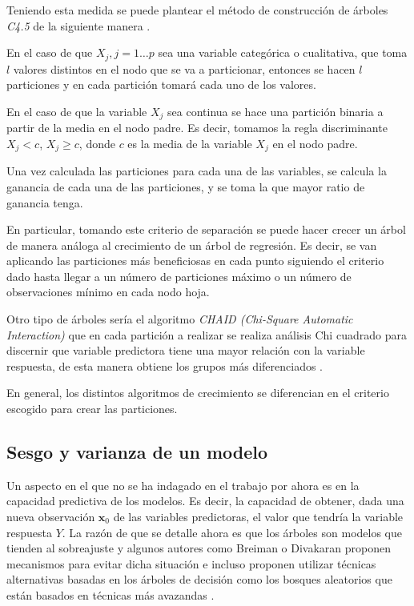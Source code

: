 \noindent Teniendo esta medida se puede plantear el método de construcción de árboles \emph{C4.5}  de la siguiente manera \cite{Loh 2014}.

\noindent En el caso de que $X_j, j=1\ldots p$ sea una variable categórica o cualitativa, que toma $l$ valores distintos en el nodo que se va a particionar, entonces se hacen $l$ particiones y en cada partición tomará cada uno de los valores. 

\noindent En el caso de que la variable $X_j$ sea continua se hace una partición binaria a partir de la media en el nodo padre. Es decir, tomamos la regla discriminante $X_j<c$, $X_j\geq c$, donde $c$ es la media de la variable $X_j$ en el nodo padre. 

\noindent Una vez calculada las particiones para cada una de las variables, se calcula la ganancia de cada una de las particiones, y se toma la que mayor ratio de ganancia tenga. 

\noindent En particular, tomando este criterio de separación se puede hacer crecer un árbol de manera análoga al crecimiento de un árbol de regresión. Es decir, se van aplicando las particiones más beneficiosas en cada punto siguiendo el criterio dado hasta llegar a un número de particiones máximo o un número de observaciones mínimo en cada nodo hoja.

\noindent Otro tipo de árboles sería el algoritmo \emph{CHAID (Chi-Square Automatic Interaction)} que en cada partición a realizar se realiza análisis Chi cuadrado para discernir que variable predictora tiene una mayor relación con la variable respuesta, de esta manera obtiene los grupos más diferenciados \cite{Kass 1980}.

\noindent En general, los distintos algoritmos de crecimiento se diferencian en el criterio escogido para crear las particiones. 
   
\subsection{Sesgo y varianza de un modelo}

\noindent Un aspecto en el que no se ha indagado en el trabajo por ahora es en la capacidad predictiva de los modelos. Es decir, la capacidad de obtener, dada una nueva observación $\mathbf{x}_0$ de las variables predictoras, el valor que tendría la variable respuesta $Y$. La razón de que se detalle ahora es que los árboles son modelos que tienden al sobreajuste y algunos autores como Breiman o Divakaran proponen mecanismos para evitar dicha situación e incluso proponen utilizar técnicas alternativas basadas en los árboles de decisión como los  bosques aleatorios que están basados en técnicas más avazandas \cite{Breiman 1984, Breiman 2001,Divakaran 2022, Hartigan 1975}. 


